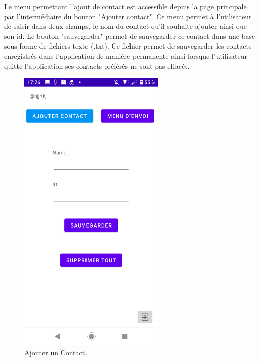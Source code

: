 Le menu permettant l'ajout de contact est accessible depuis la page principale par l'intermédiaire du bouton "Ajouter contact". Ce menu permet à l'utilisateur de saisir dans deux champs, le nom du contact qu'il souhaite ajouter ainsi que son id. Le bouton "sauvegarder" permet de sauvegarder ce contact dans une base sous forme de fichiers texte (.txt). Ce fichier permet de sauvegarder les contacts enregistrés dans l'application de manière permanente ainsi lorsque l'utilisateur quitte l'application ses contacts préférés ne sont pas effacés.
    \begin{figure}[H]
    \begin{center}
    \includegraphics[width=7cm]{images/add_contact.png}
    \caption{Ajouter un Contact.}
    \end{center}
    \end{figure}
        